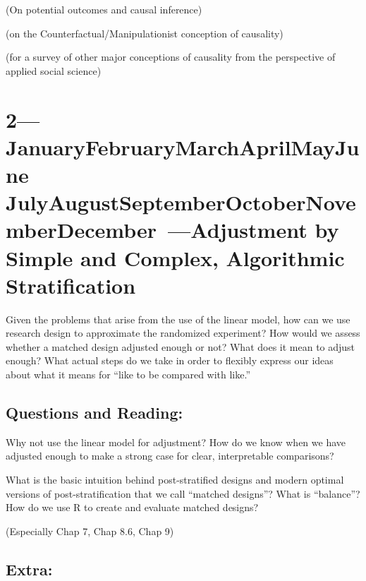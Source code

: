 \documentclass[10pt]{article}
\def\themonth{\ifcase\month\or
  January\or February\or March\or April\or May\or June\or
  July\or August\or September\or October\or November\or December\fi}
\begin{document}
\citealp[Chap 9.0 --  9.3]{gelman2007dau} (On potential outcomes and causal
inference)


\citealp[Chap 2]{angrist2009mostly}

\citealp{holland:1986a} (on the Counterfactual/Manipulationist conception of
causality)

\citealp{brady02} (for a survey of other major conceptions of causality from
the perspective of applied social science)




\AdvanceDate[1]
\section{2---\themonth~\the\day---Adjustment by Simple and Complex, Algorithmic Stratification }

Given the problems that arise from the use of the linear model, how can we use
research design to approximate the randomized experiment? How would we assess
whether a matched design adjusted enough or not? What does it mean to adjust
enough? What actual steps do we take in order to flexibly express our ideas
about what it means for ``like to be compared with like.''

\subsection{Questions and Reading:}

Why not use the linear model for adjustment? How do we know when we have
adjusted enough to make a strong case for clear, interpretable comparisons?

\citealp[Chap 6]{rosenbaum2010design}

\citealp[Chap 9.5--9.6]{gelman2007dau}

What is the basic intuition behind post-stratified designs and modern optimal
versions of post-stratification that we call ``matched designs''? What is
``balance''? How do we use R to create and evaluate matched designs?

\citealp[Chap 7--9, 13]{rosenbaum2010design} (Especially Chap 7, Chap 8.6,
Chap 9)

\subsection{Extra:}

\citealp[Chap 3]{rosenbaum2010design} 

\cite{hansen:2004a}
\end{document}
